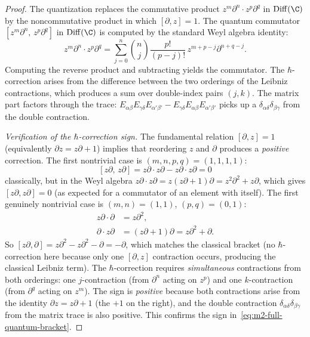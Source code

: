 \begin{proof}
The quantization replaces the commutative product $z^m\partial^n\cdot
z^p\partial^q$ in $\Diff(\C)$ by the noncommutative product in
which $[\partial,z]=1$. The quantum commutator $[z^m\partial^n,\,
z^p\partial^q]$ in $\Diff(\C)$ is computed by the standard
Weyl algebra identity:
\[
z^m\partial^n\cdot z^p\partial^q
= \sum_{j=0}^{n}\binom{n}{j}\frac{p!}{(p-j)!}\,
z^{m+p-j}\partial^{n+q-j}.
\]
Computing the reverse product and subtracting yields the
commutator. The $\hbar$-correction arises from the
difference between the two orderings of the Leibniz
contractions, which produces a sum over double-index
pairs $(j,k)$. The matrix part factors through the trace:
$E_{\alpha\beta}E_{\gamma\delta}E_{\alpha'\beta'}
- E_{\gamma\delta}E_{\alpha\beta}E_{\alpha'\beta'}$
picks up a $\delta_{\alpha\delta}\delta_{\beta\gamma}$ from
the double contraction.

\emph{Verification of the $\hbar$-correction sign.}
The fundamental relation $[\partial,z]=1$ (equivalently
$\partial z = z\partial + 1$) implies that reordering
$z$ and $\partial$ produces a \emph{positive} correction.
The first nontrivial case is $(m,n,p,q)=(1,1,1,1)$:
\[
[z\partial,\,z\partial]
= z\partial\cdot z\partial - z\partial\cdot z\partial = 0
\]
classically, but in the Weyl algebra
$z\partial\cdot z\partial = z(z\partial+1)\partial
= z^2\partial^2 + z\partial$,
which gives $[z\partial,z\partial]=0$ (as expected for a
commutator of an element with itself). The first genuinely
nontrivial case is $(m,n)=(1,1)$, $(p,q)=(0,1)$:
\begin{align*}
z\partial\cdot\partial &= z\partial^2,\\
\partial\cdot z\partial &= (z\partial+1)\partial = z\partial^2+\partial.
\end{align*}
So $[z\partial,\partial] = z\partial^2 - z\partial^2 - \partial = -\partial$,
which matches the classical bracket (no $\hbar$-correction here
because only one $[\partial,z]$ contraction occurs, producing the
classical Leibniz term). The $\hbar$-correction requires
\emph{simultaneous} contractions from both orderings: one
$j$-contraction (from $\partial^n$ acting on $z^p$) and one
$k$-contraction (from $\partial^q$ acting on $z^m$). The sign
is \emph{positive} because both contractions arise from the
identity $\partial z = z\partial + 1$ (the $+1$ on the right),
and the double contraction
$\delta_{\alpha\delta}\delta_{\beta\gamma}$ from the matrix
trace is also positive. This confirms the sign
in~\eqref{eq:m2-full-quantum-bracket}.
\end{proof}

